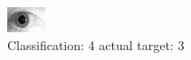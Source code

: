 \begin{figure}[h!]
\begin{center}
\includegraphics[width=0.60\columnwidth]{figures/ID1810_class_4_target_3.png}
\end{center}
\caption{ Classification: 4 actual target: 3}
\label{fig:ID1810_class_4_target_3}
\end{figure}
